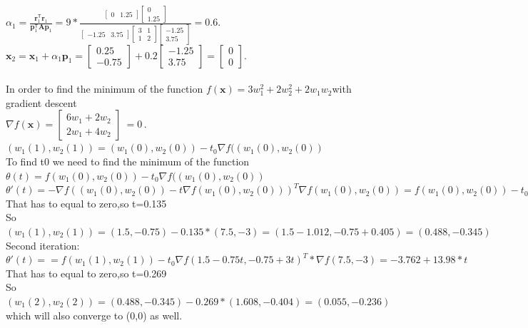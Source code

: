 \documentclass{article}
\begin{document}
${\displaystyle \alpha _{1}={\frac {\mathbf {r} _{1}^{\mathsf {T}}\mathbf {r} _{1}}{\mathbf {p} _{1}^{\mathsf {T}}\mathbf {Ap} _{1}}}=9*{\frac {{\begin{bmatrix}0&1.25\end{bmatrix}}{\begin{bmatrix}0\\1.25\end{bmatrix}}}{{\begin{bmatrix}-1.25&3.75\end{bmatrix}}{\begin{bmatrix}3&1\\1&2\end{bmatrix}}{\begin{bmatrix}-1.25\\3.75\end{bmatrix}}}}=0.6.}$\\
${\displaystyle \mathbf {x} _{2}=\mathbf {x} _{1}+\alpha _{1}\mathbf {p} _{1}={\begin{bmatrix}0.25\\-0.75\end{bmatrix}}+0.2{\begin{bmatrix}-1.25\\3.75\end{bmatrix}}={\begin{bmatrix}0\\0\end{bmatrix}}.}$\\~\\
In order to find the minimum of the function ${\displaystyle f(\mathbf {x} )=3w_1^2+2w_2^2+2w_1w_2}$with gradient descent\\
${\displaystyle \nabla f(\mathbf {x} )=\left[\begin{array}{cc} {6w_1 + 2w_2} \\ {2w_1 + 4w_2} \end{array}\right]\ =0\,.}$\\
$(w_1(1),w_2(1))=(w_1(0),w_2(0))-t_0\nabla f((w_1(0),w_2(0) )$\\
To find t0 we need to find the minimum of the function $\theta(t)=f(w_1(0),w_2(0))-t_0\nabla f((w_1(0),w_2(0) )$\\
$\theta'(t)= -\nabla f((w_1(0), w_2(0)) - t\nabla f(w_1(0), w_2(0)))^T\nabla f(w_1(0), w_2(0))=f(w_1(0),w_2(0))-t_0\nabla f(1.5-0.75t,-0.75+3t)^T*\nabla f(7.5,-3)=-38.25+283.5t$\\
That has to equal to zero,so t=0.135\\
So $(w_1(1),w_2(1))=(1.5,-0.75)-0.135*(7.5,-3)=(1.5-1.012,-0.75+0.405)=(0.488,-0.345)$\\
Second iteration:\\
$\theta '(t)==f(w_1(1),w_2(1))-t_0\nabla f(1.5-0.75t,-0.75+3t)^T*\nabla f(7.5,-3)=-3.762+13.98*t$\\
That has to equal to zero,so t=0.269\\
So $(w_1(2),w_2(2))=(0.488,-0.345)-0.269*(1.608,-0.404)=(0.055,-0.236)$\\
which will also converge to (0,0) as well.
\end{document}
